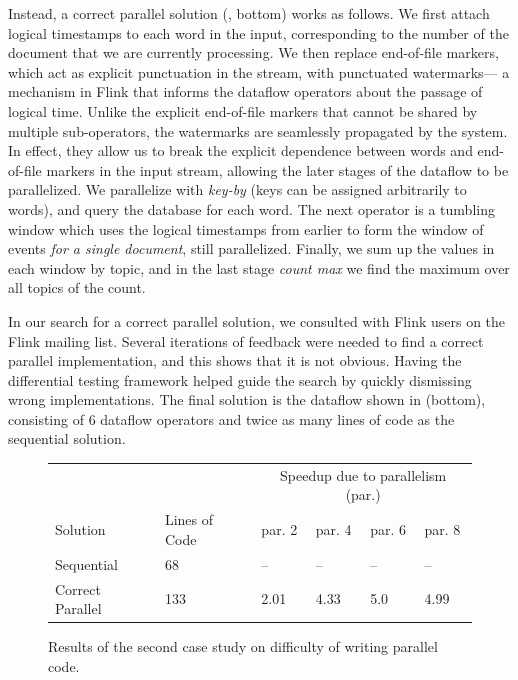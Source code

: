 Instead, a correct parallel solution (, bottom) works as follows. We first attach logical timestamps to each word in the input, corresponding to the number of the document that we are currently processing.
We then replace end-of-file markers,
which act as explicit punctuation in the stream, with punctuated watermarks---%
a mechanism in Flink that
informs the dataflow operators about the
passage of logical time. Unlike the explicit end-of-file markers that cannot
be shared by multiple sub-operators, the watermarks are seamlessly propagated
by the system. In effect, they allow us to break the explicit dependence
between words and end-of-file markers in the input stream, allowing the
later stages of the dataflow to be parallelized. We parallelize with \emph{key-by} (keys can be assigned arbitrarily to words), and query the database for each word. The next operator is a tumbling window which uses the logical timestamps from earlier to form the window of events \emph{for a single document}, still parallelized. Finally, we sum up the values in each window by topic, and in the last stage \emph{count max} we find the maximum over all topics of the count.

In our search for a correct parallel solution, we consulted with Flink users
on the Flink mailing list. Several iterations of feedback were needed to find a correct parallel implementation, and this shows that it is not obvious. Having the differential testing framework helped guide the search by quickly dismissing wrong implementations. The final solution is the
dataflow shown in  (bottom), consisting of 6
dataflow operators and twice as many lines of code as the sequential solution.

\begin{figure}[t]
  \centering
    \begin{tabular}{p{2.8cm} | p{2.5cm} | p{1.4cm}p{1.4cm}p{1.4cm}p{1.4cm}}
    & & \multicolumn{4}{c}{{Speedup due to parallelism (par.)}} \\
    Solution & Lines of Code & par. 2 & par. 4 & par. 6 & par. 8 \\
    \hline
    Sequential & 68 & -- & -- & -- & -- \\
    Correct Parallel & 133 & 2.01 & 4.33 & 5.0 & 4.99 \\
    \end{tabular}

  \bigskip

\caption[Manual parallelism case study results.]{Results of the second case study on difficulty of writing parallel code.}
\label{diffstream:fig:word-count-evaluation}
\end{figure}

